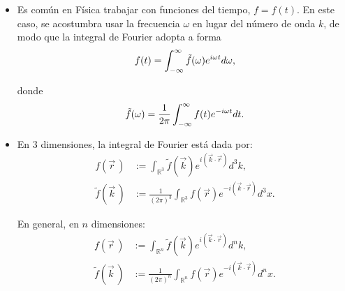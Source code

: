 \begin{itemize}
    
    
    
    \item Es común en Física trabajar con funciones del tiempo, $f = f(t)$. En este caso, se acostumbra usar la frecuencia $\omega$ en lugar del número de onda $k$, de modo que la integral de Fourier adopta a forma
    $$
    f(t) = \int_{- \infty}^{\infty} \Tilde{f}(\omega) e^{i \omega t} d\omega,
    $$

    donde
    $$
    \Tilde{f}(\omega) = \frac{1}{2\pi} \int_{- \infty}^{\infty} f(t) e^{- i \omega t} dt.
    $$
    
    \item En 3 dimensiones, la integral de Fourier está dada por:
    \begin{align*}
         f(\vec{r}\,) &:= \int_{\mathbb{R}^3} \tilde{f}(\vec{k}) e^{i (\vec{k} \cdot \vec{r})} d^3k, \\
         \tilde{f}(\vec{k}\,) &:= \frac{1}{(2\pi)^3} \int_{\mathbb{R}^3} f(\vec{r}) e^{-i (\vec{k} \cdot \vec{r})} d^3x.
    \end{align*}
    
    En general, en $n$ dimensiones:
     \begin{align*}
         f(\vec{r}\,) &:= \int_{\mathbb{R}^n} \tilde{f}(\vec{k}) e^{i (\vec{k} \cdot \vec{r})} d^n k, \\
         \tilde{f}(\vec{k}\,) &:= \frac{1}{(2\pi)^n} \int_{\mathbb{R}^n} f(\vec{r}) e^{-i (\vec{k} \cdot \vec{r})} d^n x.
    \end{align*}
   
\end{itemize}


